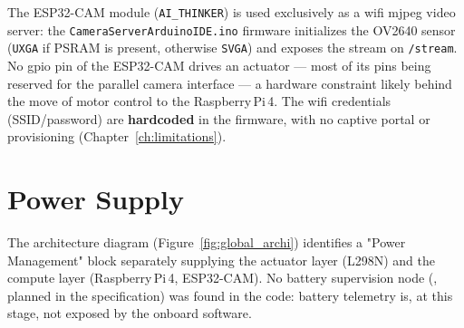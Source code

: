 The ESP32-CAM module (\texttt{AI\_THINKER}) is used exclusively as a \gls{wifi}
\gls{mjpeg} video server: the \texttt{CameraServerArduinoIDE.ino} firmware initializes
the OV2640 sensor (\texttt{UXGA} if PSRAM is present, otherwise \texttt{SVGA}) and
exposes the stream on \texttt{/stream}. No \gls{gpio} pin of the ESP32-CAM drives an
actuator --- most of its pins being reserved for the parallel camera interface --- a
hardware constraint likely behind the move of motor control to the Raspberry\,Pi\,4. The
\gls{wifi} credentials (SSID/password) are \textbf{hardcoded} in the firmware, with no
captive portal or provisioning (Chapter~\ref{ch:limitations}).

\section{Power Supply}
\label{sec:elec_power}

The architecture diagram (Figure~\ref{fig:global_archi}) identifies a "Power
Management" block separately supplying the actuator layer (L298N) and the compute layer
(Raspberry\,Pi\,4, ESP32-CAM). No battery supervision node
(, planned in the specification) was found in the code: battery
telemetry is, at this stage, not exposed by the onboard software.

